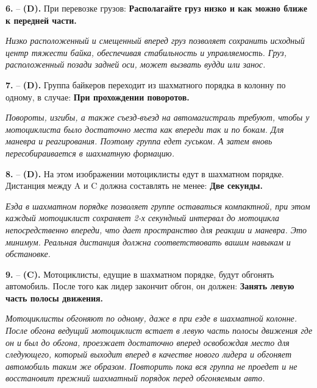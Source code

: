 \begin{minipage}{\linewidth}
\noindent\textbf{6.}  -- \textbf {(D).} При перевозке грузов:  \textbf {Располагайте груз низко и как можно ближе к передней части.} \par \textit {Низко расположенный и смещенный вперед груз позволяет сохранить исходный центр тяжести байка, обеспечивая стабильность и управляемость. Груз, расположенный позади задней оси, может вызвать вудди или занос.} \\
\end{minipage}

\begin{minipage}{\linewidth}
\noindent\textbf{7.}  -- \textbf {(D).} Группа байкеров переходит из шахматного порядка в колонну по одному, в случае:  \textbf {При прохождении поворотов.} \par \textit {Повороты, изгибы, а также съезд-въезд на автомагистраль требуют, чтобы у мотоциклиста было достаточно места как впереди так и по бокам. Для маневра и реагирования. Поэтому группа едет гуськом. А затем вновь пересобираивается в шахматную формацию.} \\
\end{minipage}

\begin{minipage}{\linewidth}
\noindent\textbf{8.}  -- \textbf {(D).} На этом изображении мотоциклисты едут в шахматном порядке. Дистанция между A и C должна составлять не менее:  \textbf {Две секунды.} \par \textit {Езда в шахматном порядке позволяет группе оставаться компактной, при этом каждый мотоциклист сохраняет 2-х секундный интервал до мотоцикла непосредственно впереди, что дает пространство для реакции и маневра. Это минимум. Реальная дистанция должна соответствовать вашим навыкам и обстановке.} \\
\end{minipage}

\begin{minipage}{\linewidth}
\noindent\textbf{9.}  -- \textbf {(C).} Мотоциклисты, едущие в шахматном порядке, будут обгонять автомобиль. После того как лидер закончит обгон, он должен:  \textbf {Занять левую часть полосы движения.} \par \textit {Мотоциклисты обгоняют по одному, даже в при езде в шахматной колонне. После обгона ведущий мотоциклист встает в левую часть полосы движения где он и был до обгона, проезжает достаточно вперед освобождая место для следующего, который выходит вперед в качестве нового лидера и обгоняет автомобиль таким же образом. Повторить пока вся группа не проедет и не восстановит прежний шахматный порядок перед обгоняемым авто.} \\
\end{minipage}

